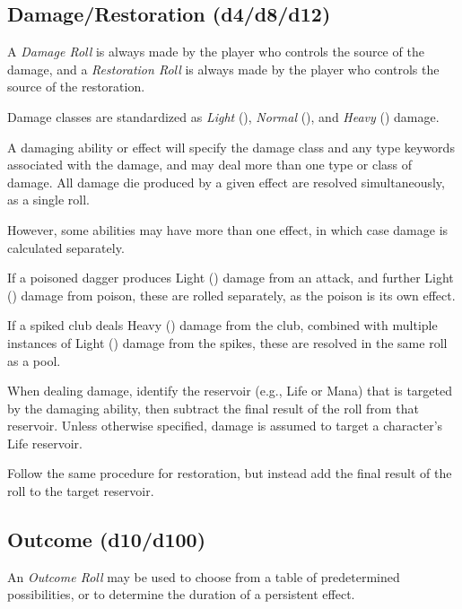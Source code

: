\subsection{Damage/Restoration (d4/d8/d12)}
A \textit{Damage Roll} is always made by the player who controls 
the source of the damage, and a \textit{Restoration Roll} 
is always made by the player who controls the source of the restoration.

\vspace{0.4em}

Damage classes are standardized as \textit{Light} (), 
\textit{Normal} (), and \textit{Heavy} () damage.

\vspace{0.4em}

A damaging ability or effect will specify the damage class 
and any type keywords associated with the damage,
and may deal more than one type or class of damage.
All damage die produced by a given effect are resolved simultaneously, 
as a single roll. 

\vspace{0.4em}

However, some abilities may have more than one effect, 
in which case damage is calculated separately.

\begin{Example}
  If a poisoned dagger produces Light () damage from an attack, 
  and further Light () damage from poison, 
  these are rolled separately, as the poison is its own effect.

  \vspace{0.4em}

  If a spiked club deals Heavy () damage from the club, 
  combined with multiple instances of Light () 
  damage from the spikes, these are resolved in the same roll as a pool.
\end{Example}

When dealing damage, identify the reservoir (e.g., Life or Mana) 
that is targeted by the damaging ability, 
then subtract the final result of the roll from that reservoir.
Unless otherwise specified, 
damage is assumed to target a character's Life reservoir.

\vspace{0.4em}

Follow the same procedure for restoration, 
but instead add the final result of the roll to the target reservoir.


\subsection{Outcome (d10/d100)}
An \textit{Outcome Roll} may be used to choose from a table of 
predetermined possibilities, 
or to determine the duration of a persistent effect.

